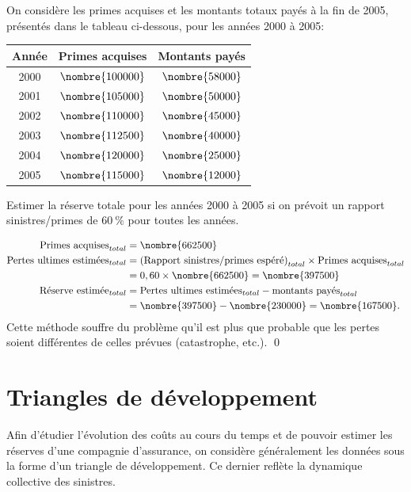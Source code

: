 \begin{exemple}
  On considère les primes acquises et les montants totaux payés à la
  fin de 2005, présentés dans le tableau ci-dessous, pour les années
  2000 à 2005:
  \begin{center}
    \begin{tabular}{|c | c c|}\hline
      Année & Primes acquises & Montants payés \\ \hline
      2000 & $\nombre{100000}$ & $\nombre{58000}$\\
      2001 & $\nombre{105000}$ & $\nombre{50000}$\\
      2002 & $\nombre{110000}$ & $\nombre{45000}$\\
      2003 & $\nombre{112500}$ & $\nombre{40000}$\\
      2004 & $\nombre{120000}$ & $\nombre{25000}$\\
      2005 & $\nombre{115000}$ & $\nombre{12000}$ \\ \hline
    \end{tabular}
  \end{center}

  Estimer la réserve totale pour les années 2000 à 2005 si on prévoit
  un rapport sinistres/primes de $60~\%$ pour toutes les années.

  \begin{align*}
    \text{Primes acquises}_{total}
    &= \nombre{662500}\\
    \text{Pertes ultimes estimées}_{total}
    &= \left(\text{Rapport sinistres/primes espéré}\right)_{total} \times \text{Primes acquises}_{total}\\
    &= 0,60 \times \nombre{662500} = \nombre{397500}\\
    \text{Réserve estimée}_{total}
    &= \text{Pertes ultimes estimées}_{total} - \text{montants payés}_{total}\\
    &=  \nombre{397500} - \nombre{230000} = \nombre{167500}.
  \end{align*}
  Cette méthode souffre du problème qu'il est plus que probable que
  les pertes soient différentes de celles prévues (catastrophe,
  etc.). %
  \qed
\end{exemple}


\section{Triangles de développement}
\label{sec:presentation:triangles}

Afin d'étudier l'évolution des coûts au cours du temps et de pouvoir
estimer les réserves d'une compagnie d'assurance, on considère
généralement les données sous la forme d'un triangle de développement.
Ce dernier reflète la dynamique collective des sinistres.

